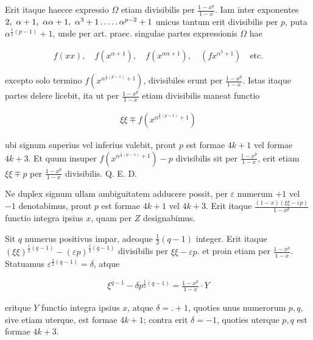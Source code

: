Erit itaque haecce expressio $\Omega$ etiam divisibilis per $\frac{1-x^p}{1-x}$. Iam inter exponentes $2,\ \alpha+1,\ \alpha\alpha+1,\ \alpha^3+1\dotsfive\alpha^{p-2}+1$ unicus tantum erit divisibilis per $p$, puta $\alpha^{\frac12(p-1)}+1$, unde per art. praec. singulae partes expressionis $\Omega$ hae

\[
\begin{aligned}
f(xx),\quad f(x^{\alpha+1}),\quad f(x^{\alpha\alpha+1}),\quad (fx^{\alpha^3+1})\quad\text{etc.}
\end{aligned}
\]

excepto solo termino $f(x^{\alpha^{\frac12(p-1)}+1})$, divisibiles erunt per $\frac{1-x^p}{1-x}$. Istas itaque partes delere licebit, ita ut per $\frac{1-x^p}{1-x}$ etiam divisibilis maneat functio

\[
\begin{aligned}
\xi\xi\mp f(x^{\alpha^{\frac12(p-1)}+1})
\end{aligned}
\]

%
ubi signum superius vel inferius valebit, prout $p$ est formae $4k+1$ vel formae $4k+3$. Et quum insuper $f(x^{\alpha^{\frac12(p-1)}+1})-p$ divisibilis sit per $\frac{1-x^p}{1-x}$, erit etiam $\xi\xi\mp p$ per $\frac{1-x^p}{1-x}$ divisibilis. Q. E. D.

Ne duplex signum ullam ambiguitatem adducere possit, per $\varepsilon$ numerum $+1$ vel $-1$ denotabimus, prout $p$ est formae $4k+1$ vel $4k+3$. Erit itaque $\frac{(1-x)(\xi\xi-\varepsilon p)}{1-x^p}$ functio integra ipsius $x$, quam per $Z$ designabimus.


Sit $q$ numerus positivus impar, adeoque $\frac12(q-1)$ integer. Erit itaque $(\xi\xi)^{\frac12(q-1)}-(\varepsilon p)^{\frac12(q-1)}$ divisibilis per $\xi\xi-\varepsilon p$. et proin etiam per $\frac{1-x^p}{1-x}$. Statuamus $\varepsilon^{\frac12(q-1)}=\delta$, atque

\[
\begin{aligned}
\xi^{q-1}-\delta p^{\frac12(q-1)}=\frac{1-x^p}{1-x}\cdot Y
\end{aligned}
\]

eritque $Y$ functio integra ipsius $x$, atque $\delta=\mathord{.}+1$, quoties unus numerorum $p,q$, sive etiam uterque, est formae $4k+1$; contra erit $\delta=-1$, quoties uterque $p,q$ est formae $4k+3$.

